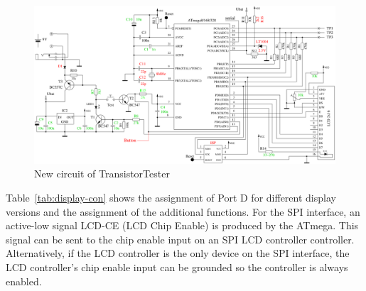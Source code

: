 \begin{figure}[H]
\centering
\includegraphics[width=1.\textwidth]{../FIG/ttester.pdf}
\caption{New circuit of TransistorTester}
\label{fig:ttester}
\end{figure}

Table~\ref{tab:display-con} shows the assignment of Port D for different display versions
and the assignment of the additional functions.
For the SPI interface, an active-low signal LCD-CE (LCD Chip Enable) is produced by the ATmega.
This signal can be sent to the chip enable input on an SPI LCD controller controller.
Alternatively, if the LCD controller is the only device on the SPI interface, the
LCD controller's chip enable input can be grounded so the controller is always enabled.

